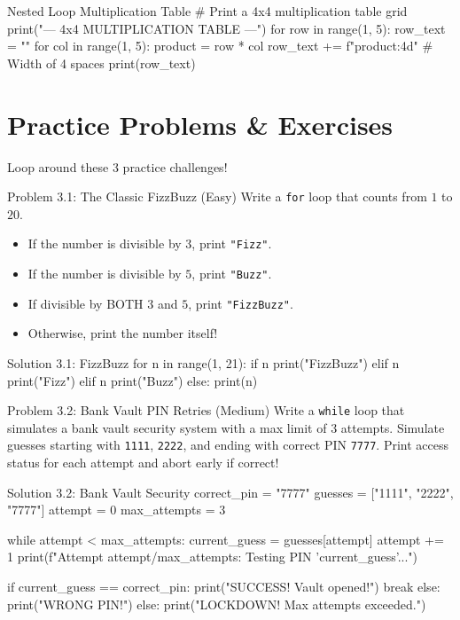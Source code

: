 \begin{pycode}{Nested Loop Multiplication Table}
# Print a 4x4 multiplication table grid
print("--- 4x4 MULTIPLICATION TABLE ---")
for row in range(1, 5):
    row_text = ""
    for col in range(1, 5):
        product = row * col
        row_text += f"{product:4d}"  # Width of 4 spaces
    print(row_text)
\end{pycode}

\section{Practice Problems \& Exercises}

Loop around these 3 practice challenges!

\begin{snakelab}{Problem 3.1: The Classic FizzBuzz (Easy)}
Write a \texttt{for} loop that counts from $1$ to $20$.
\begin{itemize}
    \item If the number is divisible by $3$, print \texttt{"Fizz"}.
    \item If the number is divisible by $5$, print \texttt{"Buzz"}.
    \item If divisible by BOTH $3$ and $5$, print \texttt{"FizzBuzz"}.
    \item Otherwise, print the number itself!
\end{itemize}
\end{snakelab}

\begin{pycode}{Solution 3.1: FizzBuzz}
for n in range(1, 21):
    if n %
        print("FizzBuzz")
    elif n %
        print("Fizz")
    elif n %
        print("Buzz")
    else:
        print(n)
\end{pycode}

\begin{snakelab}{Problem 3.2: Bank Vault PIN Retries (Medium)}
Write a \texttt{while} loop that simulates a bank vault security system with a max limit of $3$ attempts.
Simulate guesses starting with \texttt{1111}, \texttt{2222}, and ending with correct PIN \texttt{7777}.
Print access status for each attempt and abort early if correct!
\end{snakelab}

\begin{pycode}{Solution 3.2: Bank Vault Security}
correct_pin = "7777"
guesses = ["1111", "2222", "7777"]
attempt = 0
max_attempts = 3

while attempt < max_attempts:
    current_guess = guesses[attempt]
    attempt += 1
    print(f"Attempt {attempt}/{max_attempts}: Testing PIN '{current_guess}'...")
    
    if current_guess == correct_pin:
        print("SUCCESS! Vault opened!")
        break
    else:
        print("WRONG PIN!")
else:
    print("LOCKDOWN! Max attempts exceeded.")
\end{pycode}

